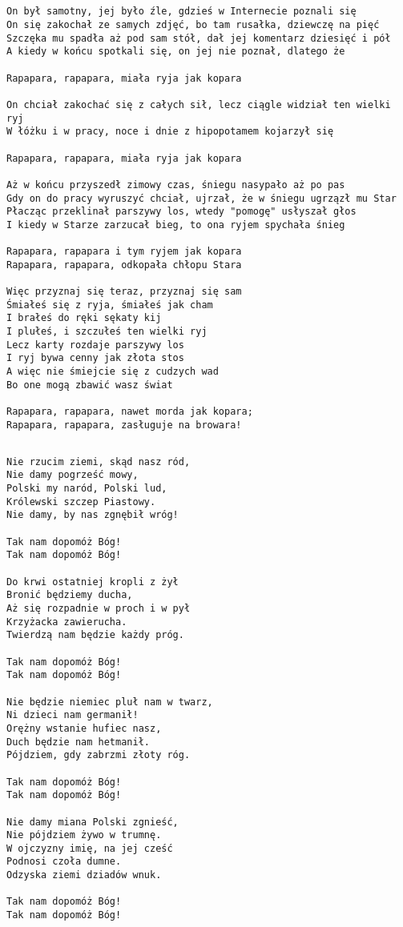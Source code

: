 \documentclass[12pt]{article}
\begin{document}
\subsection*{}
\begin{verbatim}
On był samotny, jej było źle, gdzieś w Internecie poznali się
On się zakochał ze samych zdjęć, bo tam rusałka, dziewczę na pięć
Szczęka mu spadła aż pod sam stół, dał jej komentarz dziesięć i pół
A kiedy w końcu spotkali się, on jej nie poznał, dlatego że

Rapapara, rapapara, miała ryja jak kopara

On chciał zakochać się z całych sił, lecz ciągle widział ten wielki ryj
W łóżku i w pracy, noce i dnie z hipopotamem kojarzył się

Rapapara, rapapara, miała ryja jak kopara

Aż w końcu przyszedł zimowy czas, śniegu nasypało aż po pas
Gdy on do pracy wyruszyć chciał, ujrzał, że w śniegu ugrzązł mu Star
Płacząc przeklinał parszywy los, wtedy "pomogę" usłyszał głos
I kiedy w Starze zarzucał bieg, to ona ryjem spychała śnieg

Rapapara, rapapara i tym ryjem jak kopara
Rapapara, rapapara, odkopała chłopu Stara

Więc przyznaj się teraz, przyznaj się sam
Śmiałeś się z ryja, śmiałeś jak cham
I brałeś do ręki sękaty kij
I plułeś, i szczułeś ten wielki ryj
Lecz karty rozdaje parszywy los
I ryj bywa cenny jak złota stos
A więc nie śmiejcie się z cudzych wad
Bo one mogą zbawić wasz świat

Rapapara, rapapara, nawet morda jak kopara;
Rapapara, rapapara, zasługuje na browara!
\end{verbatim}
\clearpage

\subsection*{}
\begin{verbatim}
Nie rzucim ziemi, skąd nasz ród,
Nie damy pogrześć mowy,
Polski my naród, Polski lud,
Królewski szczep Piastowy.
Nie damy, by nas zgnębił wróg!

Tak nam dopomóż Bóg!
Tak nam dopomóż Bóg!

Do krwi ostatniej kropli z żył
Bronić będziemy ducha,
Aż się rozpadnie w proch i w pył
Krzyżacka zawierucha.
Twierdzą nam będzie każdy próg.

Tak nam dopomóż Bóg!
Tak nam dopomóż Bóg!

Nie będzie niemiec pluł nam w twarz,
Ni dzieci nam germanił!
Orężny wstanie hufiec nasz,
Duch będzie nam hetmanił.
Pójdziem, gdy zabrzmi złoty róg.

Tak nam dopomóż Bóg!
Tak nam dopomóż Bóg!

Nie damy miana Polski zgnieść,
Nie pójdziem żywo w trumnę.
W ojczyzny imię, na jej cześć
Podnosi czoła dumne.
Odzyska ziemi dziadów wnuk.

Tak nam dopomóż Bóg!
Tak nam dopomóż Bóg!
\end{verbatim}
\clearpage
\end{document}
